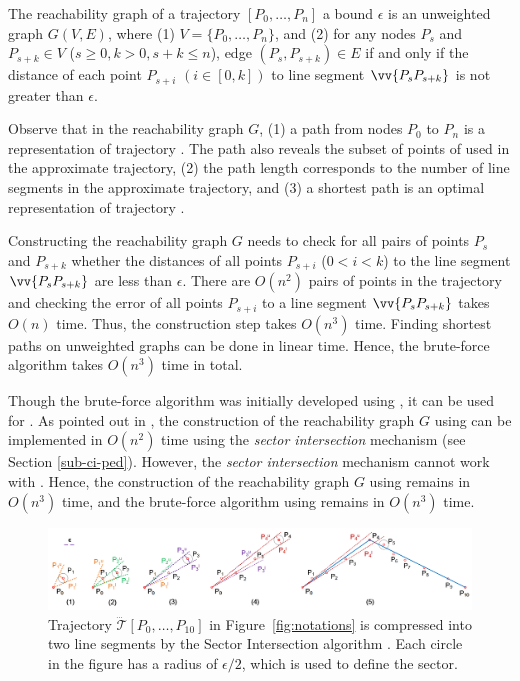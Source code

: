 The reachability graph of a trajectory ${[P_0, \ldots, P_n]}$ \wrt a bound $\epsilon$ is an unweighted graph $G(V, E)$, where (1) $V = \{P_0, \ldots, P_n\}$, and (2) for any nodes $P_s$ and $P_{s+k} \in V$ ($s\ge 0, k>0, s+k\le n$), edge $(P_s, P_{s+k}) \in E$ if and only if the distance of each point $P_{s+i}$ $(i\in[0,k])$ to line segment $\vv{P_sP_{s+k}}$ is not greater than $\epsilon$.

Observe that in the reachability graph $G$, (1) a path from nodes $P_0$ to $P_{n}$ is a representation of trajectory . The path also reveals the subset of points of  used in the approximate trajectory, (2) the path length corresponds to the number of line segments in the approximate trajectory, and
(3) a shortest path is an optimal representation of trajectory .

Constructing the reachability graph $G$ needs to check for all pairs of points $P_s$ and $P_{s+k}$ whether the distances of all points $P_{s+i}$  ($0<i<k$) to the line segment $\vv{P_sP_{s+k}}$ are less than $\epsilon$.
There are $O(n^2)$ pairs of points in the trajectory and checking the error of all points $P_{s+i}$ to a line segment $\vv{P_sP_{s+k}}$ takes $O(n)$ time.
Thus, the construction step takes $O(n^3)$ time.
Finding shortest paths on unweighted graphs can be done in linear time. Hence, the brute-force algorithm takes $O(n^3)$ time in total.

%
Though the brute-force algorithm was initially developed using \ped, it can be used for \sed.
As pointed out in \cite{Chan:Optimal}, the construction of the reachability graph $G$ using \ped can be implemented in $O(n^2)$ time using the \textit{sector intersection} mechanism (see Section \ref{sub-ci-ped}). However, the \textit{sector intersection} mechanism cannot work with \sed.  Hence, the construction of the reachability graph $G$ using \sed remains in $O(n^3)$ time, and the brute-force algorithm using \sed remains in  $O(n^3)$ time.


\begin{figure}[tb!]
	\centering
	\includegraphics[scale=0.78]{figures/Fig-sleeve.png}
	\caption{\small Trajectory $\dddot{\mathcal{T}}[P_0, \ldots, P_{10}]$ in Figure~\ref{fig:notations} is compressed into two line segments by the Sector Intersection algorithm  \cite{Williams:Longest, Sklansky:Cone}. Each circle in the figure has a radius of $\epsilon/2$, which is used to define the sector. }
	\vspace{-1ex}
	\label{fig:sleeve}
\end{figure}


